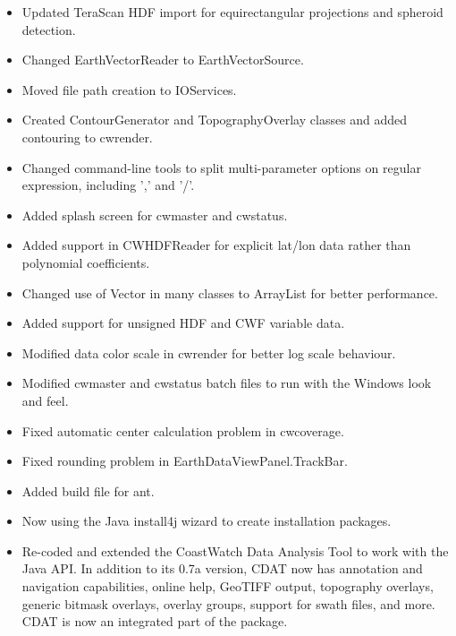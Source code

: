 \begin{itemize}

  \item Updated TeraScan HDF import for equirectangular projections
  and spheroid detection.

  \item Changed EarthVectorReader to EarthVectorSource.

  \item Moved file path creation to IOServices.

  \item Created ContourGenerator and TopographyOverlay classes and
  added contouring to cwrender.

  \item Changed command-line tools to split multi-parameter options on
  regular expression, including ',' and '/'.

  \item Added splash screen for cwmaster and cwstatus.

  \item Added support in CWHDFReader for explicit lat/lon data rather
  than polynomial coefficients.

  \item Changed use of Vector in many classes to ArrayList for better
  performance.

  \item Added support for unsigned HDF and CWF variable data.

  \item Modified data color scale in cwrender for better log scale
  behaviour.

  \item Modified cwmaster and cwstatus batch files to run with the
  Windows look and feel.

  \item Fixed automatic center calculation problem in cwcoverage.

  \item Fixed rounding problem in EarthDataViewPanel.TrackBar.

  \item Added build file for ant.

  \item Now using the Java install4j wizard to create
  installation packages.

  \item Re-coded and extended the CoastWatch Data Analysis Tool to
  work with the Java API. In addition to its 0.7a version, CDAT now
  has annotation and navigation capabilities, online help, GeoTIFF
  output, topography overlays, generic bitmask overlays, overlay
  groups, support for swath files, and more. CDAT is now an integrated
  part of the package.


\end{itemize}
